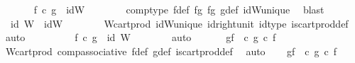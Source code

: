\begin{isabellebody}
\ \ \ \ \isamarkupfalse%
\ {}{\isacharcolon}{\kern0pt}\ {\isachardoublequoteopen}f\ {\isasymcirc}\isactrlsub c\ g\ {\isacharequal}{\kern0pt}\ idW{\isacharprime}{\kern0pt}{\isachardoublequoteclose}\isanewline
\ \ \ \ \ \ \isamarkupfalse%
\ comp{\isacharunderscore}{\kern0pt}type\ f{\isacharunderscore}{\kern0pt}def\ fg{}\ fg{}\ g{\isacharunderscore}{\kern0pt}def\ idW{\isacharprime}{\kern0pt}{\isacharunderscore}{\kern0pt}unique\ \isamarkupfalse%
\ blast\isanewline
\ \ \ \ \isamarkupfalse%
\ {}{\isacharcolon}{\kern0pt}\ {\isachardoublequoteopen}id\ W{\isacharprime}{\kern0pt}\ {\isacharequal}{\kern0pt}\ idW{\isacharprime}{\kern0pt}{\isachardoublequoteclose}\isanewline
\ \ \ \ \ \ \isamarkupfalse%
\ W{\isacharprime}{\kern0pt}{\isacharunderscore}{\kern0pt}cart{\isacharunderscore}{\kern0pt}prod\ idW{\isacharprime}{\kern0pt}{\isacharunderscore}{\kern0pt}unique\ id{\isacharunderscore}{\kern0pt}right{\isacharunderscore}{\kern0pt}unit{}\ id{\isacharunderscore}{\kern0pt}type\ is{\isacharunderscore}{\kern0pt}cart{\isacharunderscore}{\kern0pt}prod{\isacharunderscore}{\kern0pt}def\ \isamarkupfalse%
\ auto\isanewline
\ \ \ \ \isamarkupfalse%
\ {}\ {}\ \isamarkupfalse%
\ {\isachardoublequoteopen}f\ {\isasymcirc}\isactrlsub c\ g\ {\isacharequal}{\kern0pt}\ id\ W{\isacharprime}{\kern0pt}{\isachardoublequoteclose}\isanewline
\ \ \ \ \ \ \isamarkupfalse%
\ auto\isanewline
\ \ \isamarkupfalse%
\isanewline
\isanewline
\ \ \isamarkupfalse%
\ gf{}{\isacharcolon}{\kern0pt}\ {\isachardoublequoteopen}{\isasympi}\ {\isasymcirc}\isactrlsub c\ {\isacharparenleft}{\kern0pt}g\ {\isasymcirc}\isactrlsub c\ f{\isacharparenright}{\kern0pt}\ {\isacharequal}{\kern0pt}\ {\isasympi}\isanewline
\ \ \ \ \isamarkupfalse%
\ W{\isacharunderscore}{\kern0pt}cart{\isacharunderscore}{\kern0pt}prod\ comp{\isacharunderscore}{\kern0pt}associative{}\ f{\isacharunderscore}{\kern0pt}def\ g{\isacharunderscore}{\kern0pt}def\ is{\isacharunderscore}{\kern0pt}cart{\isacharunderscore}{\kern0pt}prod{\isacharunderscore}{\kern0pt}def\ \isamarkupfalse%
\ auto\isanewline
\ \ \isamarkupfalse%
\ gf{}{\isacharcolon}{\kern0pt}\ {\isachardoublequoteopen}{\isasympi}\ {\isasymcirc}\isactrlsub c\ {\isacharparenleft}{\kern0pt}g\ {\isasymcirc}\isactrlsub c\ f{\isacharparenright}{\kern0pt}\ {\isacharequal}{\kern0pt}\ {\isasympi}\isanewline

\end{isabellebody}
